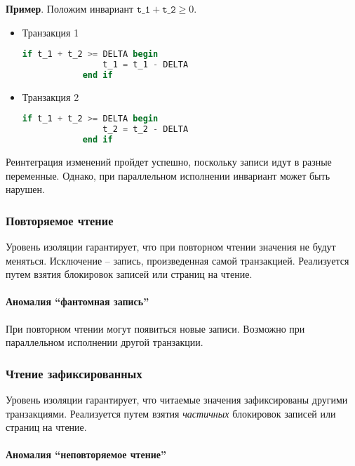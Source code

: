 \textbf{Пример}. Положим инвариант $\texttt{t\_1} + \texttt{t\_2} \geq 0$.

\begin{itemize}
	\item Транзакция 1
	      \begin{lstlisting}[language=SQL]
            if t_1 + t_2 >= DELTA begin
                t_1 = t_1 - DELTA
            end if
        \end{lstlisting}
	\item Транзакция 2
	      \begin{lstlisting}[language=SQL]
            if t_1 + t_2 >= DELTA begin
                t_2 = t_2 - DELTA
            end if
    \end{lstlisting}
\end{itemize}

Реинтеграция изменений пройдет успешно, поскольку записи идут в разные переменные. Однако, при
параллельном исполнении инвариант может быть нарушен.

\subsubsection{Повторяемое чтение}

Уровень изоляции гарантирует, что при повторном чтении значения не будут меняться. Исключение --
запись, произведенная самой транзакцией. Реализуется путем взятия блокировок записей или страниц на
чтение.

\paragraph{Аномалия ``фантомная запись''}

При повторном чтении могут появиться новые записи. Возможно при параллельном исполнении другой
транзакции.

\subsubsection{Чтение зафиксированных}

Уровень изоляции гарантирует, что читаемые значения зафиксированы другими транзакциями. Реализуется
путем взятия \textit{частичных} блокировок записей или страниц на чтение.

\paragraph{Аномалия ``неповторяемое чтение''}

